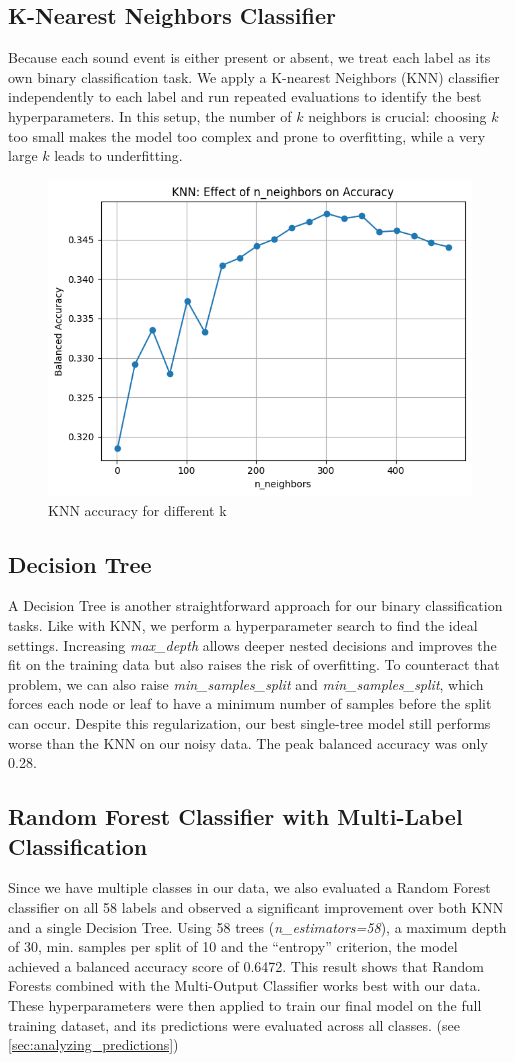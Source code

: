 \documentclass{article}
\begin{document}
\subsection{K-Nearest Neighbors Classifier}
Because each sound event is either present or absent, we treat each label as its own binary classification task. We apply a K-nearest Neighbors (KNN) classifier independently to each label and run repeated evaluations to identify the best hyperparameters. In this setup, the number of $k$ neighbors is crucial: choosing $k$ too small makes the model too complex and prone to overfitting, while a very large $k$ leads to underfitting.

\begin{figure}[H]
  \centering
  \includegraphics[width=0.30\linewidth]{knn_performance.png}
  \caption{KNN accuracy for different k}
  \label{fig_knn}
\end{figure}

\subsection{Decision Tree}
A Decision Tree is another straightforward approach for our binary classification tasks. Like with KNN, we perform a hyperparameter search to find the ideal settings. Increasing \textit{max\_depth} allows deeper nested decisions and improves the fit on the training data but also raises the risk of overfitting. To counteract that problem, we can also raise \textit{min\_samples\_split} and \textit{min\_samples\_split}, which forces each node or leaf to have a minimum number of samples before the split can occur. Despite this regularization, our best single-tree model still performs worse than the KNN on our noisy data. The peak balanced accuracy was only 0.28.

\subsection{Random Forest Classifier with Multi-Label Classification}
Since we have multiple classes in our data, we also evaluated a Random Forest classifier on all 58 labels and observed a significant improvement over both KNN and a single Decision Tree. Using 58 trees (\textit{n\_estimators=58}), a maximum depth of 30, min. samples per split of 10 and the “entropy” criterion, the model achieved a balanced accuracy score of 0.6472. This result shows that Random Forests combined with the Multi-Output Classifier works best with our data.\\
These hyperparameters were then applied to train our final model on the full training dataset, and its predictions were evaluated across all classes. (see \ref{sec:analyzing_predictions})
\end{document}
